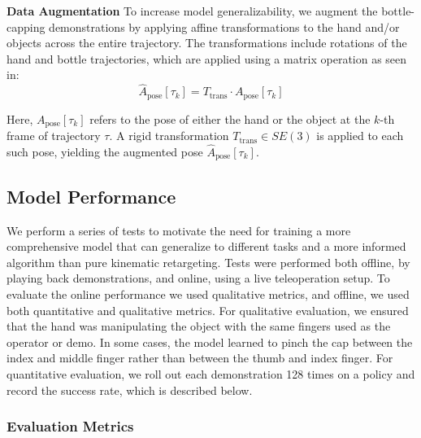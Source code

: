 \textbf{Data Augmentation}
To increase model generalizability, we augment the bottle-capping demonstrations by applying affine transformations to the hand and/or objects across the entire trajectory. The transformations include rotations of the hand and bottle trajectories, which are applied using a matrix operation as seen in:
\begin{equation}
    \hat{A}_{\text{pose}}[\tau_k] = T_{\text{trans}} \cdot A_{\text{pose}}[\tau_k]
    \label{eq:pose_transform}
\end{equation}

\noindent Here, $A_{\text{pose}}[\tau_k]$ refers to the pose of either the hand or the object 
at the $k$-th frame of trajectory $\tau$. A rigid transformation $T_{\text{trans}} \in SE(3)$ 
is applied to each such pose, yielding the augmented pose $\hat{A}_{\text{pose}}[\tau_k]$.  



\subsection{Model Performance}

We perform a series of tests to motivate the need for training a more comprehensive model that can generalize to different tasks and a more informed algorithm than pure kinematic retargeting. Tests were performed both offline, by playing back demonstrations, and online, using a live teleoperation setup. To evaluate the online performance we used qualitative metrics, and offline, we used both quantitative and qualitative metrics. For qualitative evaluation, we ensured that the hand was manipulating the object with the same fingers used as the operator or demo. In some cases, the model learned to pinch the cap between the index and middle finger rather than between the thumb and index finger. For quantitative evaluation, we roll out each demonstration 128 times on a policy and record the success rate, which is described below. 

\subsubsection{Evaluation Metrics}
\label{sec:metrics}

